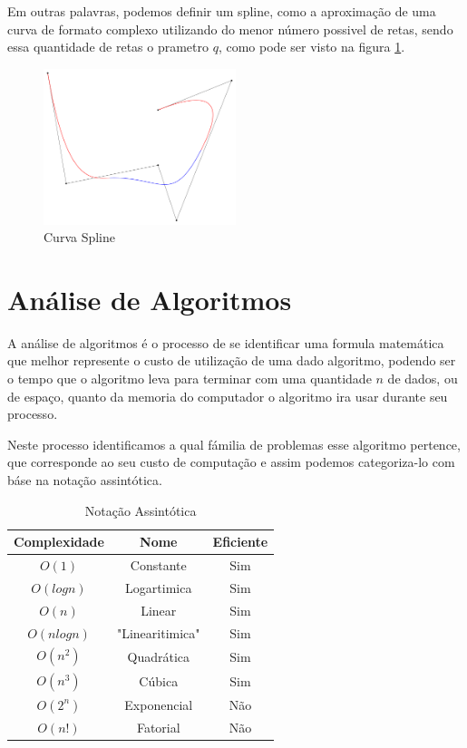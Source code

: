 \documentclass[
	12pt,				%
	openright,			%
	oneside,			%
	a4paper,			%
	english,			%
	brazil				%
	]{abntex2}
\begin{document}
Em outras palavras, podemos definir um spline, como a aproximação de uma curva de formato complexo utilizando do 
menor número possivel de retas, sendo essa quantidade de retas o prametro $q$, como pode ser visto na figura \ref{Curva Spline}.

\begin{figure}[htb]
    \centering
    \caption{\label{Curva Spline}Curva Spline}
    \includegraphics[width=0.50\textwidth]{../Imgs/B-spline_curve.png}
\end{figure}


\section{Análise de Algoritmos}

A análise de algoritmos é o processo de se identificar uma formula matemática que melhor represente o custo de
utilização de uma dado algoritmo, podendo ser o tempo que o algoritmo leva para terminar com uma quantidade $n$
de dados, ou de espaço, quanto da memoria do computador o algoritmo ira usar durante seu processo.

Neste processo identificamos a qual fámilia de problemas esse algoritmo pertence, que corresponde ao seu custo de
computação \cite{introductionAlgorthms} e assim podemos categoriza-lo com báse na notação assintótica.

\begin{table}[htb]
	\centering
	\caption{\label{Notação Assintótica}Notação Assintótica}
	\begin{tabular}{|c|c|c|}
	\hline
		Complexidade & Nome & Eficiente \\ \hline
		$O(1)$ & Constante & Sim \\ \hline
		$O(log n)$ & Logartimica & Sim \\ \hline
		$O(n)$ & Linear & Sim \\ \hline
		$O(n log n)$ & "Linearitimica" & Sim \\ \hline
		$O(n^2)$ & Quadrática & Sim \\ \hline
		$O(n^3)$ & Cúbica & Sim \\ \hline
		$O(2^n)$ & Exponencial & Não \\ \hline
		$O(n!)$ & Fatorial & Não \\ \hline
	\end{tabular}
\end{table}
\end{document}
